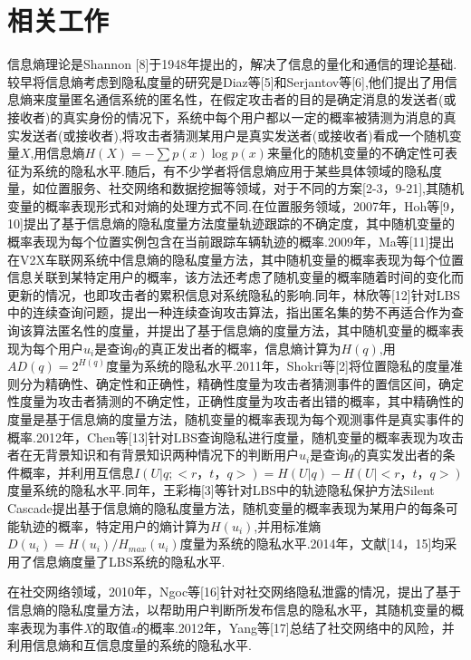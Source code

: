 \section{相关工作}\label{related work}

信息熵理论是Shannon [8]于1948年提出的，解决了信息的量化和通信的理论基础.较早将信息熵考虑到隐私度量的研究是Diaz等[5]和Serjantov等[6],他们提出了用信息熵来度量匿名通信系统的匿名性，在假定攻击者的目的是确定消息的发送者(或接收者)的真实身份的情况下，系统中每个用户都以一定的概率被猜测为消息的真实发送者(或接收者),将攻击者猜测某用户是真实发送者(或接收者)看成一个随机变量$X$,用信息熵$H(X)=-\sum p(x)\log p(x)$来量化的随机变量的不确定性可表征为系统的隐私水平.随后，有不少学者将信息熵应用于某些具体领域的隐私度量，如位置服务、社交网络和数据挖掘等领域，对于不同的方案[2-3，9-21],其随机变量的概率表现形式和对熵的处理方式不同.在位置服务领域，2007年，Hoh等[9，10]提出了基于信息熵的隐私度量方法度量轨迹跟踪的不确定度，其中随机变量的概率表现为每个位置实例包含在当前跟踪车辆轨迹的概率.2009年，Ma等[11]提出在V2X车联网系统中信息熵的隐私度量方法，其中随机变量的概率表现为每个位置信息关联到某特定用户的概率，该方法还考虑了随机变量的概率随着时间的变化而更新的情况，也即攻击者的累积信息对系统隐私的影响.同年，林欣等[12]针对LBS中的连续查询问题，提出一种连续查询攻击算法，指出匿名集的势不再适合作为查询该算法匿名性的度量，并提出了基于信息熵的度量方法，其中随机变量的概率表现为每个用户$u_{i}$是查询$q$的真正发出者的概率，信息熵计算为$H(q)$,用$AD(q)=2^{H(q)}$度量为系统的隐私水平.2011年，Shokri等[2]将位置隐私的度量准则分为精确性、确定性和正确性，精确性度量为攻击者猜测事件的置信区间，确定性度量为攻击者猜测的不确定性，正确性度量为攻击者出错的概率，其中精确性的度量是基于信息熵的度量方法，随机变量的概率表现为每个观测事件是真实事件的概率.2012年，Chen等[13]针对LBS查询隐私进行度量，随机变量的概率表现为攻击者在无背景知识和有背景知识两种情况下的判断用户$u_{i}$是查询$q$的真实发出者的条件概率，并利用互信息$I(U|q;<r，t，q>)=H(U|q)-H(U|<r，t，q>)$度量系统的隐私水平.同年，王彩梅[3]等针对LBS中的轨迹隐私保护方法Silent Cascade提出基于信息熵的隐私度量方法，随机变量的概率表现为某用户的每条可能轨迹的概率，特定用户的熵计算为$H(u_{i})$,并用标准熵$D(u_{i})=H(u_{i})/H_{max}(u_{i})$度量为系统的隐私水平.2014年，文献[14，15]均采用了信息熵度量了LBS系统的隐私水平.

在社交网络领域，2010年，Ngoc等[16]针对社交网络隐私泄露的情况，提出了基于信息熵的隐私度量方法，以帮助用户判断所发布信息的隐私水平，其随机变量的概率表现为事件\textit{X}的取值\textit{x}的概率.2012年，Yang等[17]总结了社交网络中的风险，并利用信息熵和互信息度量的系统的隐私水平.

